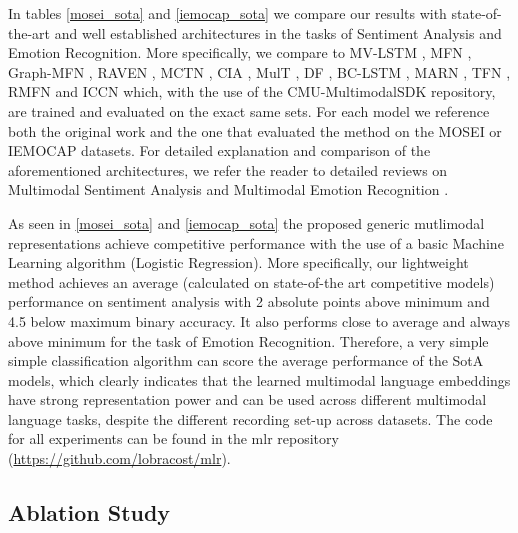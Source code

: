 In tables \ref{mosei_sota} and \ref{iemocap_sota} we compare our results with state-of-the-art and well established architectures in the tasks of Sentiment Analysis and Emotion Recognition. More specifically, we compare to MV-LSTM \cite{rajagopalan2016extending}, MFN \cite{zadeh2018memory}, Graph-MFN \cite{zadeh2018multimodal}, RAVEN \cite{wang2019words}, MCTN \cite{pham2019found}, CIA \cite{chauhan-etal-2019-context}, MulT \cite{tsai2019multimodal}, DF \cite{nojavanasghari2016deep}, BC-LSTM \cite{poria2017context}, MARN \cite{zadeh2018multi}, TFN \cite{zadeh2017tensor}, RMFN \cite{liang2018multimodal} and ICCN \cite{sun2020learning} which, with the use of the CMU-MultimodalSDK repository, are trained and evaluated on the exact same sets. For each model we reference both the original work and the one that evaluated the method on the MOSEI or IEMOCAP datasets. For detailed explanation and comparison of the aforementioned architectures, we refer the reader to detailed reviews on Multimodal Sentiment Analysis \cite{gkoumas2021makes} and Multimodal Emotion Recognition \cite{app11177962}. 

As seen in \ref{mosei_sota} and \ref{iemocap_sota} the proposed generic mutlimodal representations achieve competitive performance with the use of a basic Machine Learning algorithm (Logistic Regression). More specifically, our lightweight method achieves an average (calculated on state-of-the art competitive models) performance on sentiment analysis with 2 absolute points above minimum and 4.5 below maximum binary accuracy. It also performs close to average and always above minimum for the task of Emotion Recognition. Therefore, a very simple simple classification algorithm can score the average performance of the SotA models, which clearly indicates that the learned multimodal language embeddings have strong representation power and can be used across different multimodal language tasks, despite the different recording set-up across datasets. The code for all experiments can be found in the mlr repository (\href{https://github.com/lobracost/mlr}{https://github.com/lobracost/mlr}). 

\subsection{Ablation Study}\label{ablation_study}


